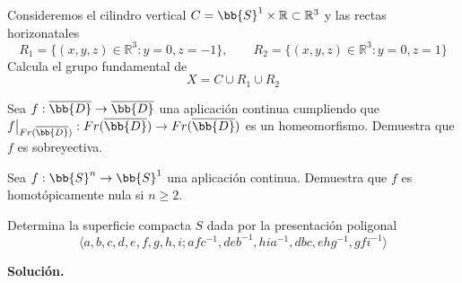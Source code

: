 \documentclass[12pt]{article}
\begin{document}
    \begin{ejercicio}
        Consideremos el cilindro vertical $C=\bb{S}^1\times \mathbb{R}\subset \mathbb{R}^3$ y las rectas horizonatales
        \begin{equation*}
            R_1 = \{(x,y,z)\in \mathbb{R}^3 : y=0, z=-1\}, \qquad R_2 = \{(x,y,z)\in \mathbb{R}^3 : y= 0, z=1\}
        \end{equation*}
        Calcula el grupo fundamental de
        \begin{equation*}
            X = C\cup R_1\cup R_2
        \end{equation*}
    \end{ejercicio}

    \begin{ejercicio}
        Sea $f:\overline{\bb{D}}\to \overline{\bb{D}}$ una aplicación continua cumpliendo que $f\big|_{Fr(\overline{\bb{D}})}:Fr(\overline{\bb{D}})\to Fr(\overline{\bb{D}})$ es un homeomorfismo. Demuestra que $f$ es sobreyectiva.
    \end{ejercicio}

    \begin{ejercicio}
        Sea $f:\bb{S}^n\to \bb{S}^1$ una aplicación continua. Demuestra que $f$ es homotópicamente nula si $n\geq 2$.
    \end{ejercicio}

    \begin{ejercicio}
        Determina la superficie compacta $S$ dada por la presentación poligonal
        \begin{equation*}
            \langle a,b,c,d,e,f,g,h,i;afc^{-1}, deb^{-1}, hia^{-1}, dbc, ehg^{-1}, gfi^{-1} \rangle 
        \end{equation*}
    \end{ejercicio}

    \newpage
    \setcounter{ejercicio}{0} %
    \noindent
    \textbf{Solución.}
\end{document}
